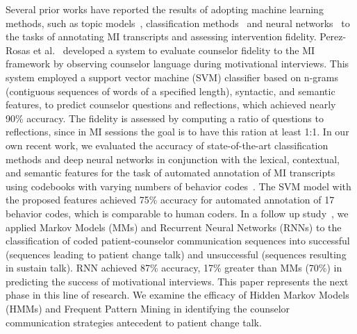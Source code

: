 Several prior works have reported the results of adopting machine learning methods, such as topic models~\cite{kotov2014towards, gaut2017content, imel2015computational, kotov2015interpretable, atkins2014scaling}, classification methods~\cite{hasan2016study, can2016sounds, perez2017predicting, perez2017understanding} and neural networks~\cite{hasan2016study, tanana2015recursive, tanana2016comparison} to the tasks of annotating MI transcripts and assessing intervention fidelity. Perez-Rosas et al.~\cite{perez2017predicting} developed a system to evaluate counselor fidelity to the MI framework by observing counselor language during motivational interviews. This system employed a support vector machine (SVM) classifier based on n-grams (contiguous sequences of words of a specified length), syntactic, and semantic features, to predict counselor questions and reflections, which achieved nearly 90\% accuracy. The fidelity is assessed by computing a ratio of questions to reflections, since in MI sessions the goal is to have this ration at least 1:1. In our own recent work, we evaluated the accuracy of state-of-the-art classification methods and deep neural networks in conjunction with the lexical, contextual, and semantic features for the task of automated annotation of MI transcripts using codebooks with varying numbers of behavior codes~\cite{hasan2016study}. The SVM model with the proposed features achieved 75\% accuracy for automated annotation of 17 behavior codes, which is comparable to human coders. In a follow up study~\cite{hasan2018predicting}, we applied Markov Models (MMs) and Recurrent Neural Networks (RNNs) to the classification of coded patient-counselor communication sequences into successful (sequences leading to patient change talk) and unsuccessful (sequences resulting in sustain talk). RNN achieved 87\% accuracy, 17\% greater than MMs (70\%) in predicting the success of motivational interviews. This paper represents the next phase in this line of research. We examine the efficacy of Hidden Markov Models (HMMs) and Frequent Pattern Mining in identifying the counselor communication strategies antecedent to patient change talk.

